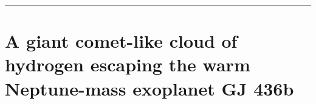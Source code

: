 \documentclass[onecolumn]{aastex63}
\begin{document}






\vspace{1cm}
\hrule
\vspace{1cm}

\section{A giant comet-like cloud of hydrogen escaping the warm Neptune-mass exoplanet GJ 436b}
\begin{centering}

\cite{ehrenreich2015}

\end{centering}

\end{document}
